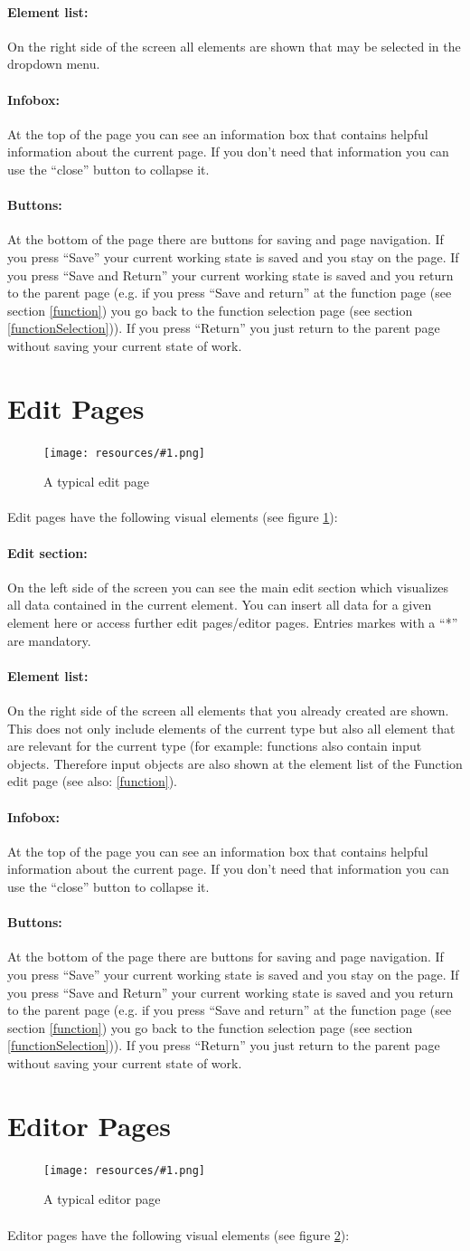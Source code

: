 \documentclass[a4paper,10pt]{book}
\newcommand{\bigpic}[1]{\texttt{[image: resources/\#1.png]}}
\newcommand{\infobox}{\paragraph{Infobox:} At the top of the page you can see an information box that contains helpful information about the current page. If you don't need that information you can use the ``close'' button to collapse it.}
\newcommand{\buttons}{\paragraph{Buttons:} At the bottom of the page there are buttons for saving and page navigation. If you press ``Save'' your current working state is saved and you stay on the page. If you press ``Save and Return'' your current working state is saved and you return to the parent page (e.g. if you press ``Save and return'' at the function page (see section \ref{function}) you go back to the function selection page (see section \ref{functionSelection})). If you press ``Return'' you just return to the parent page without saving your current state of work.}
\begin{document}
\paragraph{Element list:} On the right side of the screen all elements are shown that may be selected in the dropdown menu.
\infobox
\buttons

\section{Edit Pages}

\begin{figure}
 \bigpic{editPage}
 \caption{A typical edit page}
\label{layout-editPage}
\end{figure}

\paragraph{} Edit pages have the following visual elements (see figure \ref{layout-editPage}):
\paragraph{Edit section:} On the left side of the screen you can see the main edit section which visualizes all data contained in the current element. You can insert all data for a given element here or access further edit pages/editor pages. Entries markes with a ``*'' are mandatory.
\paragraph{Element list:} On the right side of the screen all elements that you already created are shown. This does not only include elements of the current type but also all element that are relevant for the current type (for example: functions also contain input objects. Therefore input objects are also shown at the element list of the Function edit page (see also: \ref{function}).
\infobox
\buttons

\section{Editor Pages}
\label{layout-editorPages}

\begin{figure}
 \bigpic{editorPage}
 \caption{A typical editor page}
\label{layout-editorPage}
\end{figure}


\paragraph{} Editor pages have the following visual elements (see figure \ref{layout-editorPage}):
\end{document}
